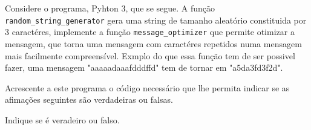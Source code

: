 \documentclass[12pt,varwidth=16cm,border=1pt]{standalone}
\begin{document}
Considere o programa, Pyhton 3, que se segue. A função \verb+random_string_generator+ gera uma string de tamanho aleatório constituida por 3 caractéres, implemente a função \verb+message_optimizer+ que permite otimizar a mensagem, que torna uma mensagem com caractéres repetidos numa mensagem mais facilmente compreensível. Exmplo do que essa função tem de ser possivel fazer, uma mensagem "aaaaadaaafdddffd" tem de tornar em "a5da3fd3f2d".



Acrescente a este programa o código necessário que lhe permita indicar se as
afimações seguintes são verdadeiras ou falsas.

Indique se é veradeiro ou falso.
\end{document}
